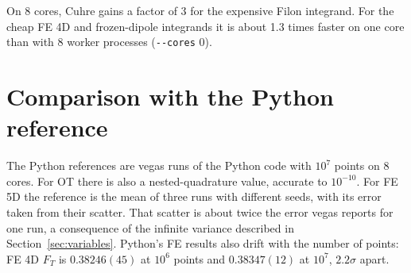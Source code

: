 \documentclass[11pt,a4paper]{article}
\newcommand{\opt}[1]{\texttt{-{}-#1}}
\begin{document}
On 8 cores, Cuhre gains a factor of 3 for the expensive Filon integrand. For the
cheap FE 4D and frozen-dipole integrands it is about 1.3 times faster on one
core than with 8 worker processes (\opt{cores} 0).

\section{Comparison with the Python reference}
\label{sec:python}

The Python references are vegas runs of the Python code with
$10^7$ points on 8 cores. For OT there is also a nested-quadrature value,
accurate to $10^{-10}$. For FE 5D the reference is the mean of three runs with
different seeds, with its error taken from their scatter. That scatter is about
twice the error vegas reports for one run, a consequence of the infinite
variance described in Section~\ref{sec:variables}. Python's FE results also
drift with the number of points: FE 4D $F_T$ is $0.38246(45)$ at $10^6$ points
and $0.38347(12)$ at $10^7$, $2.2\sigma$ apart.
\end{document}
